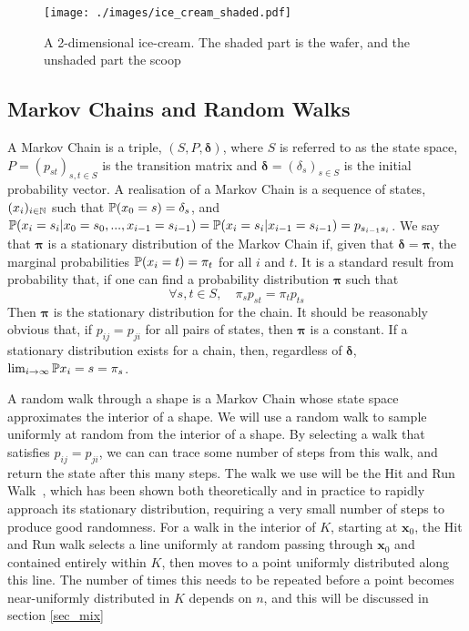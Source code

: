\begin{figure}
\centering
\texttt{[image: ./images/ice\_cream\_shaded.pdf]}
\caption{A 2-dimensional ice-cream. The shaded part is the wafer, and the unshaded part the scoop}
\label{fig_ice_cream}
\end{figure}
\subsection{Markov Chains and Random Walks}

A Markov Chain is a triple, $(S,P,\bm{\delta})$, where $S$ is referred to as the state space, $P = (p_{st})_{s,t \in S}$ is the transition matrix and $\bm{\delta} = (\delta_s)_{s \in S}$ is the initial probability vector. A realisation of a Markov Chain is a sequence of states, $(x_i)_{i \in \mathbb{N}}$ such that $\mathbb{P} (x_0 = s)=\delta_s$, and $\mathbb{P}(x_i = s_i | x_0 = s_0, ..., x_{i-1} = s_{i-1}) = \mathbb{P} (x_i = s_i | x_{i-1} = s_{i-1})= p_{s_{i-1}s_{i}}$. We say that $\bm{\pi}$ is a stationary distribution of the Markov Chain if, given that $\bm{\delta} = \bm{\pi}$, the marginal probabilities $\mathbb{P}(x_i = t) = \pi_t$ for all $i$ and $t$.  It is a standard result from probability that, if one can find a probability distribution $\bm{\pi}$ such that
$$
\forall s,t \in S, \quad \pi_s p_{st} = \pi_t p_{ts}
$$
Then $\bm{\pi}$ is the stationary distribution for the chain. It should be reasonably obvious that, if $p_{ij} = p_{ji}$ for all pairs of states, then $\bm{\pi}$ is a constant. If a stationary distribution exists for a chain, then, regardless of $\bm{\delta}$, $\lim_{i-> \infty} \mathbb{P} {x_i = s} = \pi_s$.

A random walk through a shape is a Markov Chain whose state space approximates the interior of a shape. We will use a random walk to sample uniformly at random from the interior of a shape. By selecting a walk that satisfies $p_{ij} = p_{ji}$, we can can trace some number of steps from this walk, and return the state after this many steps. The walk we use will be the Hit and Run Walk~\cite{Lovasz03a}, which has been shown both theoretically and in practice to rapidly approach its stationary distribution, requiring a very small number of steps to produce good randomness. For a walk in the interior of $K$, starting at $\bm{x}_0$, the Hit and Run walk selects a line uniformly at random passing through $\bm{x}_0$ and contained entirely within $K$, then moves to a point uniformly distributed along this line. The number of times this needs to be repeated before a point becomes near-uniformly distributed in $K$ depends on $n$, and this will be discussed in section \ref{sec_mix}

